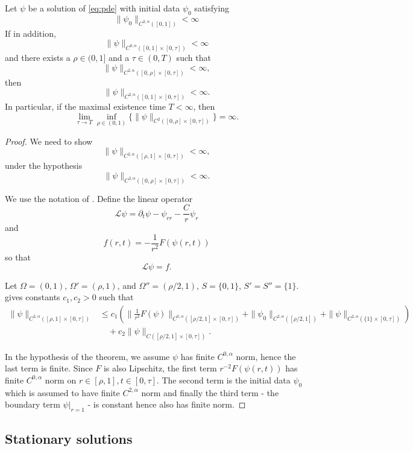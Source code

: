 \documentclass{amsart}
\begin{document}
\begin{lemma}
\label{lem:apriori_bounds}
Let \(\psi\) be a solution of \eqref{eq:pde} with initial data \(\psi_0\) satisfying
\[
\|\psi_0\|_{C^{2,\alpha}([0, 1])} < \infty
\]
If in addition,
\[
\|\psi\|_{C^{0,\alpha}([0, 1] \times [0, \tau])} < \infty
\]
and there exists a \(\rho \in (0, 1]\) and a \(\tau \in (0, T)\) such that
\[
\|\psi\|_{C^{2,\alpha}([0, \rho] \times [0, \tau])} < \infty,
\]
then
\[
\|\psi\|_{C^{2,\alpha}([0, 1] \times [0, \tau])} < \infty.
\]
In particular, if the maximal existence time \(T < \infty\), then
\[
\lim_{\tau\to T} \inf_{\rho \in (0, 1)} \{\|\psi\|_{C^2([0, \rho] \times [0, \tau])}\} = \infty.
\]
\end{lemma}

\begin{proof}
We need to show
\[
\|\psi\|_{C^{2,\alpha}([\rho, 1] \times [0, \tau])} < \infty,
\]
under the hypothesis
\[
\|\psi\|_{C^{2,\alpha}([0, \rho] \times [0, \tau])} < \infty.
\]

We use the notation of \cite[Theorem 10.1]{Ladyzhenskaja:/1967}. Define the linear operator
\[
\mathcal{L} \psi = \partial_t \psi - \psi_{rr} - \frac{C}{r} \psi_r
\]
and
\[
f(r, t) = -\frac{1}{r^2} F(\psi(r, t))
\]
so that
\[
\mathcal{L} \psi = f.
\]

Let \(\Omega = (0, 1)\), \(\Omega' = (\rho, 1)\), and \(\Omega'' = (\rho/2, 1)\), \(S = \{0, 1\}\), \(S' = S'' = \{1\}\). \cite[Theorem 10.1]{Ladyzhenskaja:/1967} gives constants \(c_1, c_2 > 0\) such that
\[
\begin{split}
\|\psi\|_{C^{2,\alpha}([\rho, 1] \times [0, \tau])} &\leq c_1 \left(\|\tfrac{1}{r^2} F(\psi)\|_{C^{0,\alpha}([\rho/2, 1] \times [0, \tau])} + \|\psi_0\|_{C^{2,\alpha}([\rho/2, 1])} + \|\psi\|_{C^{2,\alpha}(\{1\} \times [0, \tau])} \right) \\
&\quad + c_2 \|\psi\|_{C([\rho/2, 1] \times [0, \tau])}.
\end{split}
\]

In the hypothesis of the theorem, we assume \(\psi\) has finite \(C^{0,\alpha}\) norm, hence the last term is finite. Since \(F\) is also Lipschitz, the first term \(r^{-2} F(\psi(r, t))\) has finite \(C^{0,\alpha}\) norm on \(r \in [\rho, 1], t \in [0, \tau]\). The second term is the initial data \(\psi_0\) which is assumed to have finite \(C^{2,\alpha}\) norm and finally the third term - the boundary term \(\psi|_{r=1}\) - is constant hence also has finite norm.
\end{proof}

\subsection{Stationary solutions}
\end{document}
